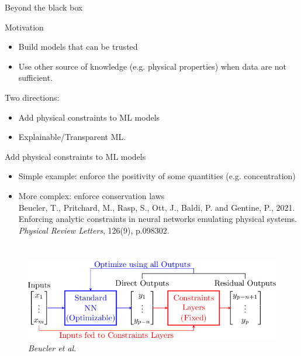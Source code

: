 \documentclass[handout, 10pt]{beamer}
\newcommand{\rref}[1][]{\hfill{\scriptsize\textit{#1}}}
\begin{document}
\begin{frame}{Beyond the black box}
\begin{block}{Motivation}
\begin{itemize}
    \item Build models that can be trusted
    \item Use other source of knowledge (e.g. physical properties) when data are not sufficient.
\end{itemize}
\end{block}

Two directions:
\begin{itemize}
    \item Add physical constraints to ML models
    \item Explainable/Transparent ML.
\end{itemize}


\end{frame}


\begin{frame}{Add physical constraints to ML models}
\begin{itemize}
    \item \alert{Simple example}: enforce the positivity of some quantities (e.g. concentration)
    \item \alert{More complex}: enforce conservation laws\\
    {\small
Beucler, T., Pritchard, M., Rasp, S., Ott, J., Baldi, P. and Gentine, P., 2021. Enforcing analytic constraints in neural networks emulating physical systems. {\it Physical Review Letters}, 126(9), p.098302.}
\end{itemize}
\begin{columns}
\begin{figure}
    \centering
    \includegraphics[width=\textwidth]{fig/3-Figure2-1.png}\\
\rref[Beucler et al.]
\end{figure}
\end{columns}
\end{frame}
\end{document}
